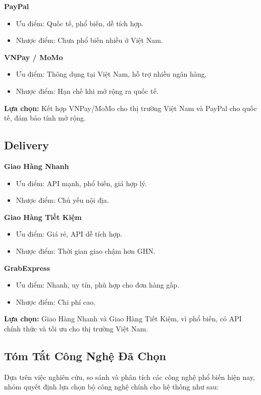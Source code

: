 \documentclass{article}
\begin{document}
\textbf{PayPal}
\begin{itemize}
    \item Ưu điểm: Quốc tế, phổ biến, dễ tích hợp.
    \item Nhược điểm: Chưa phổ biến nhiều ở Việt Nam.
\end{itemize}

\textbf{VNPay / MoMo}
\begin{itemize}
    \item Ưu điểm: Thông dụng tại Việt Nam, hỗ trợ nhiều ngân hàng.
    \item Nhược điểm: Hạn chế khi mở rộng ra quốc tế.
\end{itemize}

\textbf{Lựa chọn:} Kết hợp VNPay/MoMo cho thị trường Việt Nam và PayPal cho quốc tế, đảm bảo tính mở rộng.

\subsection{Delivery}

\textbf{Giao Hàng Nhanh}
\begin{itemize}
    \item Ưu điểm: API mạnh, phổ biến, giá hợp lý.
    \item Nhược điểm: Chủ yếu nội địa.
\end{itemize}

\textbf{Giao Hàng Tiết Kiệm}
\begin{itemize}
    \item Ưu điểm: Giá rẻ, API dễ tích hợp.
    \item Nhược điểm: Thời gian giao chậm hơn GHN.
\end{itemize}

\textbf{GrabExpress}
\begin{itemize}
    \item Ưu điểm: Nhanh, uy tín, phù hợp cho đơn hàng gấp.
    \item Nhược điểm: Chi phí cao.
\end{itemize}

\textbf{Lựa chọn:} Giao Hàng Nhanh và Giao Hàng Tiết Kiệm, vì phổ biến, có API chính thức và tối ưu cho thị trường Việt Nam.

\subsection*{Tóm Tắt Công Nghệ Đã Chọn}

\quad Dựa trên việc nghiên cứu, so sánh và phân tích các công nghệ phổ biến hiện nay, nhóm quyết định lựa chọn bộ công nghệ chính cho hệ thống như sau:
\end{document}
